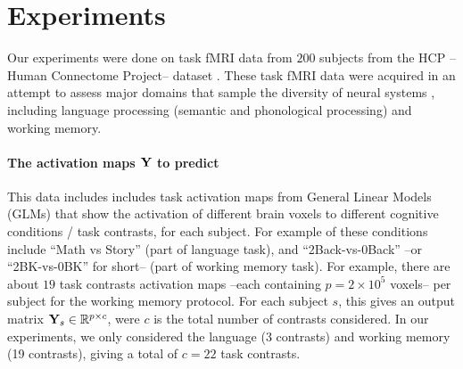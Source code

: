 
\section{Experiments}
\label{sec:exp}
Our experiments were done on task fMRI data from
$200$ subjects from the HCP --Human Connectome Project-- dataset
 \citep{VanEssen20122222}. These task fMRI data were acquired in an
 attempt to assess major
 domains that sample the diversity of neural systems , including
 language processing (semantic and phonological
processing) and working memory.
\paragraph{The activation maps $\mathbf{Y}$ to predict}
This data includes includes task activation
maps from General Linear Models (GLMs)  \citep{friston1994statistical} that show the activation
of different brain voxels to different cognitive conditions / task contrasts, for each subject.
For example of these conditions include ``Math vs Story'' (part of language task),
and ``2Back-vs-0Back'' --or ``2BK-vs-0BK'' for short-- (part of working memory task).
For example, there are about $19$ task contrasts activation maps
--each containing $p = 2 \times 10^5$ voxels-- per subject for the
working memory protocol. For each subject $s$, this gives an output matrix
$\mathbf{Y}_s \in \mathbb R^{p \times c}$, were $c$ is the total number of contrasts considered.
In our experiments, we only considered the language (3 contrasts) and working memory
(19 contrasts), giving a total of $c=22$ task contrasts.\\

